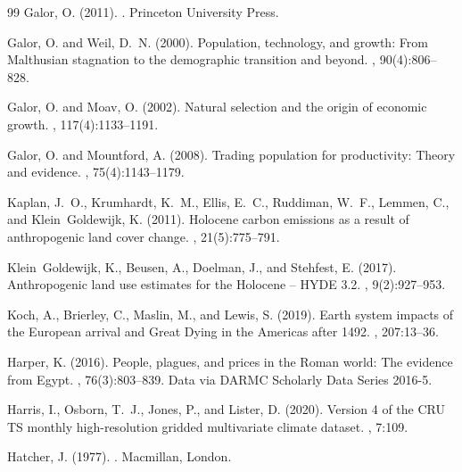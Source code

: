 \documentclass[11pt,letterpaper]{article}
\begin{document}
\begin{thebibliography}{99}
Galor, O. (2011).
.
\newblock Princeton University Press.

Galor, O. and Weil, D.~N. (2000).
\newblock Population, technology, and growth: From Malthusian stagnation to the demographic transition and beyond.
, 90(4):806--828.

Galor, O. and Moav, O. (2002).
\newblock Natural selection and the origin of economic growth.
, 117(4):1133--1191.

Galor, O. and Mountford, A. (2008).
\newblock Trading population for productivity: Theory and evidence.
, 75(4):1143--1179.

Kaplan, J.~O., Krumhardt, K.~M., Ellis, E.~C., Ruddiman, W.~F., Lemmen, C., and Klein~Goldewijk, K. (2011).
\newblock Holocene carbon emissions as a result of anthropogenic land cover change.
, 21(5):775--791.

Klein~Goldewijk, K., Beusen, A., Doelman, J., and Stehfest, E. (2017).
\newblock Anthropogenic land use estimates for the {H}olocene -- {HYDE} 3.2.
, 9(2):927--953.

Koch, A., Brierley, C., Maslin, M., and Lewis, S. (2019).
\newblock Earth system impacts of the European arrival and Great Dying in the {Americas} after 1492.
, 207:13--36.

Harper, K. (2016).
\newblock People, plagues, and prices in the {Roman} world: The evidence from {Egypt}.
, 76(3):803--839.
\newblock Data via DARMC Scholarly Data Series 2016-5.

Harris, I., Osborn, T.~J., Jones, P., and Lister, D. (2020).
\newblock Version 4 of the {CRU TS} monthly high-resolution gridded multivariate climate dataset.
, 7:109.

Hatcher, J. (1977).
.
\newblock Macmillan, London.


\end{thebibliography}
\end{document}
